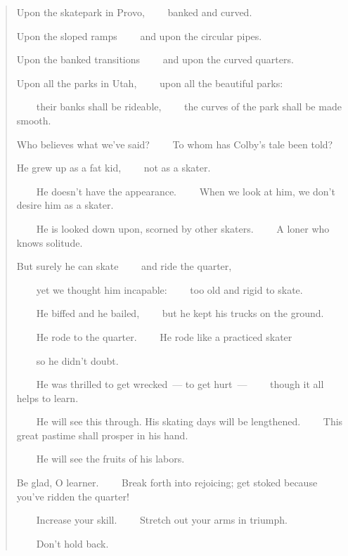 \begin{verse}
Upon the skatepark in Provo, ~~~~banked and curved.

Upon the sloped ramps ~~~~and upon the circular pipes.

Upon the banked transitions ~~~~and upon the curved quarters.

Upon all the parks in Utah, ~~~~upon all the beautiful parks:

~~~~their banks shall be rideable, ~~~~the curves of the park shall be made smooth.

Who believes what we've said? ~~~~To whom has Colby's tale been told?

He grew up as a fat kid, ~~~~not as a skater.

~~~~He doesn't have the appearance. ~~~~When we look at him, we don't desire him as a skater.

~~~~He is looked down upon, scorned by other skaters. ~~~~A loner who knows solitude.

But surely he can skate ~~~~and ride the quarter,

~~~~yet we thought him incapable: ~~~~too old and rigid to skate.

~~~~He biffed and he bailed, ~~~~but he kept his trucks on the ground.

~~~~He rode to the quarter. ~~~~He rode like a practiced skater

~~~~so he didn't doubt.

~~~~He was thrilled to get wrecked~--- to get hurt~--- ~~~~though it all helps to learn.

~~~~He will see this through. His skating days will be lengthened. ~~~~This great pastime shall prosper in his hand.

~~~~He will see the fruits of his labors.

Be glad, O learner. ~~~~Break forth into rejoicing; get stoked because you've ridden the quarter!

~~~~Increase your skill. ~~~~Stretch out your arms in triumph.

~~~~Don't hold back.
\end{verse}
